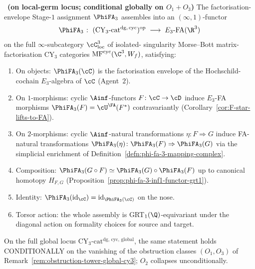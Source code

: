 \begin{theorem}
\label{thm:morphism-functoriality-phi-fa-3-wave-residuals}
\ClaimStatusProvedHere\ {\bfseries(on local-germ locus; conditional
globally on $O_1 + O_3$)}
The factorisation-envelope Stage-$1$ assignment $\PhiFA_3$ assembles
into an $(\infty,1)$-functor
\[
  \PhiFA_3 \;\colon\;
  (\mathrm{CY}_3\text{-cat}^{\mathrm{dg},\,\mathrm{cyc}})^{\mathrm{op}}
  \;\longrightarrow\; E_3\text{-FA}(\R^3)
\]
on the full $\infty$-subcategory $\cC_{\mathrm{loc}}^3$ of isolated-
singularity Morse--Bott matrix-factorisation CY$_3$ categories
$\mathrm{MF}^{\mathrm{cyc}}(\C^3, W_f)$, satisfying:
\begin{enumerate}[label=\textup{(\roman*)}]
 \item On objects: $\PhiFA_3(\cC)$ is the factorisation envelope of
       the Hochschild-cochain $E_3$-algebra of $\cC$ (Agent~$2$).
 \item On $1$-morphisms: cyclic $\Ainf$-functors $F \colon \cC \to \cD$
       induce $E_3$-FA morphisms $\PhiFA_3(F) = \cU^\FA(F^*)$
       contravariantly (Corollary~\ref{cor:F-star-lifts-to-FA}).
 \item On $2$-morphisms: cyclic $\Ainf$-natural transformations
       $\eta \colon F \Rightarrow G$ induce FA-natural transformations
       $\PhiFA_3(\eta) \colon \PhiFA_3(F) \Rightarrow \PhiFA_3(G)$
       via the simplicial enrichment of
       Definition~\ref{defn:phi-fa-3-mapping-complex}.
 \item Composition: $\PhiFA_3(G\circ F) \simeq \PhiFA_3(G) \circ
       \PhiFA_3(F)$ up to canonical homotopy $H_{F,G}$
       (Proposition~\ref{prop:phi-fa-3-inf1-functor-grt1}).
 \item Identity: $\PhiFA_3(\mathrm{id}_\cC) = \mathrm{id}_{\PhiFA_3(\cC)}$
       on the nose.
 \item Torsor action: the whole assembly is GRT$_1(\Q)$-equivariant
       under the diagonal action on formality choices for source and
       target.
\end{enumerate}
On the full global locus $\mathrm{CY}_3\text{-cat}^{\mathrm{dg},\,\mathrm{cyc,\,global}}$,
the same statement holds CONDITIONALLY on the vanishing of the
obstruction classes $(O_1, O_3)$ of
Remark~\ref{rem:obstruction-tower-global-cy3}; $O_2$ collapses
unconditionally.
\end{theorem}


